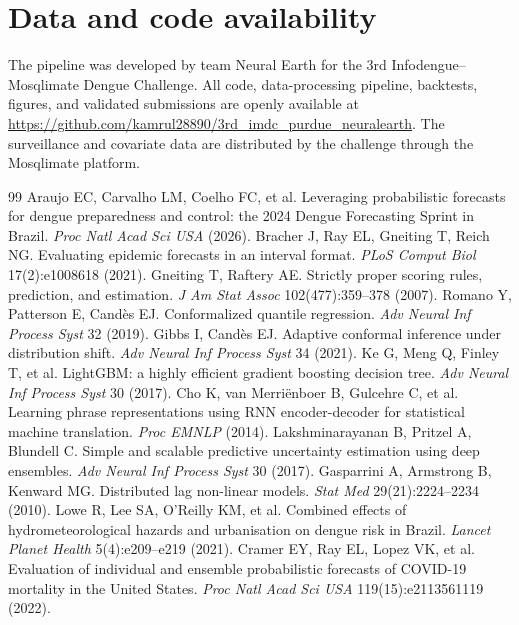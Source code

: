 \documentclass[11pt]{article}
\begin{document}
\section*{Data and code availability}
The pipeline was developed by team Neural Earth for the 3rd Infodengue--Mosqlimate Dengue Challenge.
All code, data-processing pipeline, backtests, figures, and validated submissions are openly available
at \url{https://github.com/kamrul28890/3rd_imdc_purdue_neuralearth}. The surveillance and covariate
data are distributed by the challenge through the Mosqlimate platform.


\begin{thebibliography}{99}
\small
{} Araujo EC, Carvalho LM, Coelho FC, et al. Leveraging probabilistic forecasts for dengue preparedness and control: the 2024 Dengue Forecasting Sprint in Brazil. \emph{Proc Natl Acad Sci USA} (2026).
 Bracher J, Ray EL, Gneiting T, Reich NG. Evaluating epidemic forecasts in an interval format. \emph{PLoS Comput Biol} 17(2):e1008618 (2021).
 Gneiting T, Raftery AE. Strictly proper scoring rules, prediction, and estimation. \emph{J Am Stat Assoc} 102(477):359--378 (2007).
 Romano Y, Patterson E, Cand\`es EJ. Conformalized quantile regression. \emph{Adv Neural Inf Process Syst} 32 (2019).
 Gibbs I, Cand\`es EJ. Adaptive conformal inference under distribution shift. \emph{Adv Neural Inf Process Syst} 34 (2021).
 Ke G, Meng Q, Finley T, et al. LightGBM: a highly efficient gradient boosting decision tree. \emph{Adv Neural Inf Process Syst} 30 (2017).
 Cho K, van Merri\"enboer B, Gulcehre C, et al. Learning phrase representations using RNN encoder-decoder for statistical machine translation. \emph{Proc EMNLP} (2014).
 Lakshminarayanan B, Pritzel A, Blundell C. Simple and scalable predictive uncertainty estimation using deep ensembles. \emph{Adv Neural Inf Process Syst} 30 (2017).
 Gasparrini A, Armstrong B, Kenward MG. Distributed lag non-linear models. \emph{Stat Med} 29(21):2224--2234 (2010).
 Lowe R, Lee SA, O'Reilly KM, et al. Combined effects of hydrometeorological hazards and urbanisation on dengue risk in Brazil. \emph{Lancet Planet Health} 5(4):e209--e219 (2021).
 Cramer EY, Ray EL, Lopez VK, et al. Evaluation of individual and ensemble probabilistic forecasts of COVID-19 mortality in the United States. \emph{Proc Natl Acad Sci USA} 119(15):e2113561119 (2022).

\end{thebibliography}
\end{document}
